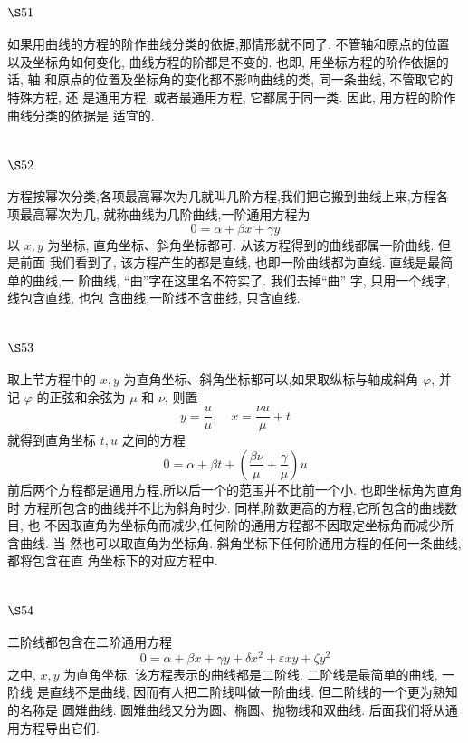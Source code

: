 \section{$\S 51$}

如果用曲线的方程的阶作曲线分类的依据,那情形就不同了. 不管轴和原点的位置 以及坐标角如何变化, 曲线方程的阶都是不变的. 也即, 用坐标方程的阶作依据的话, 轴 和原点的位置及坐标角的变化都不影响曲线的类, 同一条曲线, 不管取它的特殊方程, 还 是通用方程, 或者最通用方程, 它都属于同一类. 因此, 用方程的阶作曲线分类的依据是 适宜的.

\section{$\S 52$}

方程按幂次分类,各项最高幂次为几就叫几阶方程,我们把它搬到曲线上来,方程各 项最高幂次为几, 就称曲线为几阶曲线,一阶通用方程为
\[
0=\alpha+\beta x+\gamma y
\]
以 $x, y$ 为坐标, 直角坐标、斜角坐标都可. 从该方程得到的曲线都属一阶曲线. 但是前面 我们看到了, 该方程产生的都是直线, 也即一阶曲线都为直线. 直线是最简单的曲线,一 阶曲线, “曲”字在这里名不符实了. 我们去掉“曲” 字, 只用一个线字, 线包含直线, 也包 含曲线,一阶线不含曲线, 只含直线.

\section{$\S 53$}

取上节方程中的 $x, y$ 为直角坐标、斜角坐标都可以,如果取纵标与轴成斜角 $\varphi$, 并记 $\varphi$ 的正弦和余弦为 $\mu$ 和 $\nu$, 则置
\[
y=\frac{u}{\mu}, \quad x=\frac{\nu u}{\mu}+t
\]
就得到直角坐标 $t, u$ 之间的方程
\[
0=\alpha+\beta t+\left(\frac{\beta \nu}{\mu}+\frac{\gamma}{\mu}\right) u
\]
前后两个方程都是通用方程,所以后一个的范围并不比前一个小. 也即坐标角为直角时 方程所包含的曲线并不比为斜角时少. 同样,阶数更高的方程,它所包含的曲线数目, 也 不因取直角为坐标角而减少,任何阶的通用方程都不因取定坐标角而减少所含曲线. 当 然也可以取直角为坐标角. 斜角坐标下任何阶通用方程的任何一条曲线, 都将包含在直 角坐标下的对应方程中.


\section{$\S 54$}

二阶线都包含在二阶通用方程
\[
0=\alpha+\beta x+\gamma y+\delta x^{2}+\varepsilon x y+\zeta y^{2}
\]
之中, $x, y$ 为直角坐标. 该方程表示的曲线都是二阶线. 二阶线是最简单的曲线, 一阶线 是直线不是曲线, 因而有人把二阶线叫做一阶曲线. 但二阶线的一个更为熟知的名称是 圆雉曲线. 圆雉曲线又分为圆、椭圆、抛物线和双曲线. 后面我们将从通用方程导出它们.

